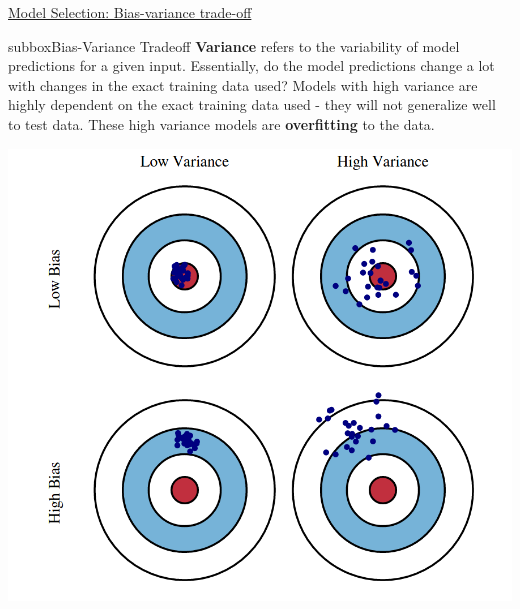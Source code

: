 \begin{textbox}{\href{https://compneuro.neuromatch.io/tutorials/W1D2_ModelFitting/student/W1D2_Tutorial5.html}{Model Selection: Bias-variance trade-off }  }
\begin{subbox}{subbox}{Bias-Variance Tradeoff}
\textbf{Variance} refers to the variability of model predictions for a given input. Essentially, do the model predictions change a lot with changes in the exact training data used? Models with high variance are highly dependent on the exact training data used - they will not generalize well to test data. These high variance models are \textbf{overfitting} to the data.

\centering
\includegraphics[scale=0.13]{Figures/ModelFitting/MFFigure6.png}
\end{subbox}
\end{textbox}